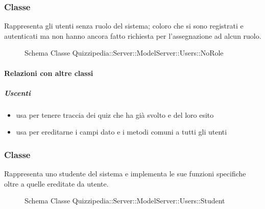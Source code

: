 \subsubsection{Classe }
Rappresenta gli utenti senza ruolo del sistema; coloro che si sono registrati e autenticati ma non hanno ancora fatto richiesta per l'assegnazione ad alcun ruolo.
\begin{figure}[H]
\centering
\noindent{}
\caption[Schema Classe NoRole]{Schema Classe Quizzipedia::Server::ModelServer::Users::NoRole}
\end{figure}
\paragraph{Relazioni con altre classi}
\subparagraph{Uscenti}
\begin{itemize}
\item usa  per tenere traccia dei quiz che ha già svolto e del loro esito
\item usa  per ereditarne i campi dato e i metodi comuni a tutti gli utenti
\end{itemize}
\subsubsection{Classe }
Rappresenta uno studente del sistema e implementa le sue funzioni specifiche oltre a quelle ereditate da utente.
\begin{figure}[H]
\centering
\noindent{}
\caption[Schema Classe Student]{Schema Classe Quizzipedia::Server::ModelServer::Users::Student}
\end{figure}
